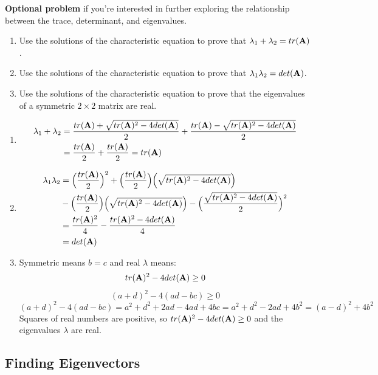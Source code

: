 \begin{prob}
\textbf{Optional problem} if you're interested in further exploring the relationship between the trace, determinant, and eigenvalues.
\begin{enumerate}
\item Use the solutions of the characteristic equation to prove that $\lambda_1 + \lambda_2 = tr(\mathbf{A})$.
\item Use the solutions of the characteristic equation to prove that $\lambda_1 \lambda_2 = det(\mathbf{A})$.
\item Use the solutions of the characteristic equation to prove that the eigenvalues of a symmetric $2\times 2$ matrix are real.
\end{enumerate}
\end{prob}
\begin{sol}
\begin{enumerate}
    \item 
    \begin{align*}
    \lambda_1+\lambda_2 &= \frac{tr(\mathbf{A}) + \sqrt{tr(\mathbf{A})^2 - 4 det(\mathbf{A})}}{2}+\frac{tr(\mathbf{A}) - \sqrt{tr(\mathbf{A})^2 - 4 det(\mathbf{A})}}{2}\\
    &=\frac{tr(\mathbf{A})}{2}+\frac{tr(\mathbf{A})}{2}=tr(\mathbf{A})
    \end{align*}
    \item
    \begin{align*}
    \lambda_1 \lambda_2 &= \Big(\frac{tr(\mathbf{A})}{2}\Big)^2+\Big(\frac{tr(\mathbf{A})}{2}\Big)\Big( \sqrt{tr(\mathbf{A})^2 -4 det(\mathbf{A})}\Big)\\
    &-\Big(\frac{tr(\mathbf{A})}{2}\Big)\Big( \sqrt{tr(\mathbf{A})^2 - 4 det(\mathbf{A})}\Big)-\Big(\frac{\sqrt{tr(\mathbf{A})^2 - 4 det(\mathbf{A})}}{2}\Big)^2\\
    &=\frac{tr(\mathbf{A})^2}{4}-\frac{tr(\mathbf{A})^2 - 4 det(\mathbf{A})}{4}\\
    &=det(\mathbf{A})
    \end{align*}
\item Symmetric means $b=c$ and real $\lambda$ means:
\[tr(\mathbf{A})^2 - 4 det(\mathbf{A})\ge 0\]
\[(a+d)^2-4(ad-bc)\ge 0 \]
\[(a+d)^2-4(ad-bc)=a^2+d^2+2ad-4ad+4bc=a^2+d^2-2ad+4b^2=(a-d)^2+4b^2\]
Squares of real numbers are positive, so $tr(\mathbf{A})^2 - 4 det(\mathbf{A}) \ge 0$ and the eigenvalues $\lambda$ are real.
\end{enumerate}
\end{sol}

\subsection{Finding Eigenvectors}


